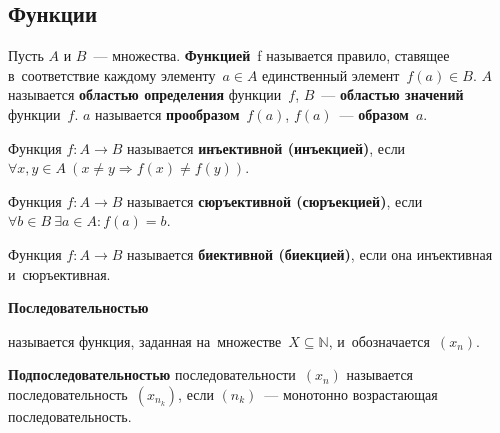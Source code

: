 \subsection{Функции}
\hypertarget{def:function}{} Пусть $A$ и $B$~--- множества.
\textbf{Функцией}~f называется правило, ставящее в~соответствие каждому элементу~$a \in A$ единственный элемент~$f(a) \in B$.
$A$ называется \textbf{областью определения} функции~$f$, $B$~--- \textbf{областью значений} функции~$f$.
$a$ называется \textbf{прообразом}~$f(a)$, $f(a)$~--- \textbf{образом}~$a$.

\hypertarget{def:injection}{} Функция $f \colon A \to B$ называется \textbf{инъективной (инъекцией)}, если
$\forall x, y \in A	\ \allowbreak (x \neq y \Rightarrow f(x) \neq f(y))$.

\hypertarget{def:surjection}{} Функция $f \colon A \to B$ называется \textbf{сюръективной (сюръекцией)}, если
$\forall b \in B \ \allowbreak \exists a \in A \colon \allowbreak f(a) = b$.

\hypertarget{def:bijection}{} Функция $f \colon A \to B$ называется \textbf{биективной (биекцией)}, если она инъективная
и~сюръективная.

\hypertarget{def:sequence}{\textbf{Последовательностью}} называется функция, заданная на~множестве~$X \subseteq \mathbb N$, и~обозначается~$(x_n)$.

\textbf{Подпоследовательностью} последовательности~$(x_n)$ называется последовательность~$(x_{n_k})$, если $(n_k)$~--- монотонно возрастающая последовательность.